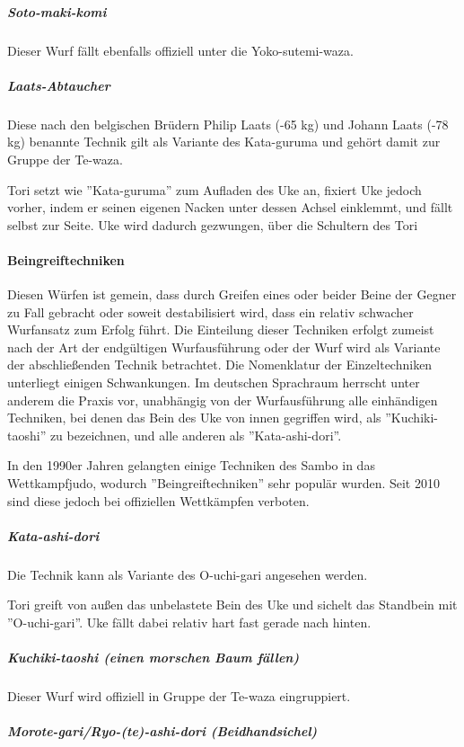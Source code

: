 \documentclass[justified, a4paper, notitlepage, captions=tableheading, nobib]{tufte-handout}
\begin{document}
\subparagraph{Soto-maki-komi}
\label{sec:org0288a9c}

Dieser Wurf fällt ebenfalls offiziell unter die Yoko-sutemi-waza.

\subparagraph{Laats-Abtaucher}
\label{sec:orgd83baca}

Diese nach den belgischen Brüdern Philip Laats (-65 kg) und Johann Laats (-78 kg) benannte Technik gilt als Variante des Kata-guruma und gehört damit zur Gruppe der Te-waza.

Tori setzt wie ''Kata-guruma'' zum Aufladen des Uke an, fixiert Uke jedoch vorher, indem er seinen eigenen Nacken unter dessen Achsel einklemmt, und fällt selbst zur Seite. Uke wird dadurch gezwungen, über die Schultern des Tori 

\paragraph{Beingreiftechniken}
\label{sec:orgcb9abf5}

Diesen Würfen ist gemein, dass durch Greifen eines oder beider Beine der Gegner zu Fall gebracht oder soweit destabilisiert wird, dass ein relativ schwacher Wurfansatz zum Erfolg führt. Die Einteilung dieser Techniken erfolgt zumeist nach der Art der endgültigen Wurfausführung oder der Wurf wird als Variante der abschließenden Technik betrachtet. Die Nomenklatur der Einzeltechniken unterliegt einigen Schwankungen. Im deutschen Sprachraum herrscht unter anderem die Praxis vor, unabhängig von der Wurfausführung alle einhändigen Techniken, bei denen das Bein des Uke von innen gegriffen wird, als ''Kuchiki-taoshi'' zu bezeichnen, und alle anderen als ''Kata-ashi-dori''.

In den 1990er Jahren gelangten einige Techniken des Sambo in das Wettkampfjudo, wodurch ''Beingreiftechniken'' sehr populär wurden. Seit 2010 sind diese jedoch bei offiziellen Wettkämpfen verboten.

\subparagraph{Kata-ashi-dori}
\label{sec:orgcbe730d}

Die Technik kann als Variante des O-uchi-gari angesehen werden.

Tori greift von außen das unbelastete Bein des Uke und sichelt das Standbein mit ''O-uchi-gari''. Uke fällt dabei relativ hart fast gerade nach hinten.

\subparagraph{Kuchiki-taoshi (einen morschen Baum fällen)}
\label{sec:orgafa4401}
Dieser Wurf wird offiziell in Gruppe der Te-waza eingruppiert.

\subparagraph{Morote-gari/Ryo-(te)-ashi-dori (Beidhandsichel)}
\label{sec:org4f38725}
\end{document}
